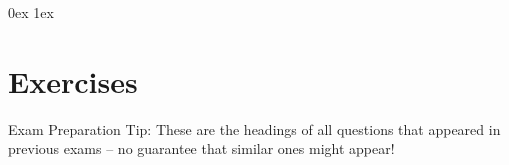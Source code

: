 

\renewcommand{\course}{Machine Learning}

\script


\clearpage
\slidefont
\fancyhfoffset{0mm}






%



\subappendix


\noappendix


\clearpage
\fancyhfoffset{0mm}
\parindent 0ex
\parskip 1ex

\section{Exercises}















\clearpage
Exam Preparation Tip: These are the headings of all questions that appeared in
previous exams -- no guarantee that similar ones might appear!

